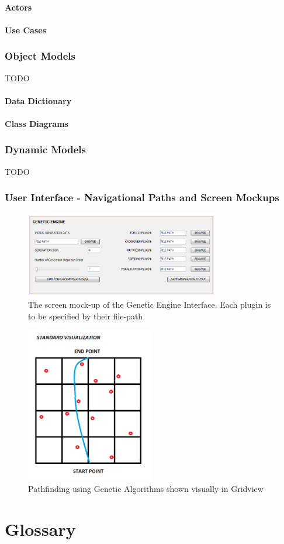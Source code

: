 \paragraph{Actors}
\paragraph{Use Cases}

\subsubsection{Object Models}
TODO
\paragraph{Data Dictionary}
\paragraph{Class Diagrams}

\subsubsection{Dynamic Models}
TODO
\subsubsection{User Interface - Navigational Paths and Screen Mockups}
\begin{figure}[h!]
 \caption{The screen mock-up of the Genetic Engine Interface. Each plugin is to be specified by their file-path.}
 \includegraphics[width=0.75\textwidth]{../../screen1.png}
\end{figure}

\begin{figure}[h!]
 \caption{Pathfinding using Genetic Algorithms shown visually in Gridview}
 \includegraphics[width=0.5\textwidth]{../../screen2.png}
\end{figure}

%
%
\section{Glossary}



